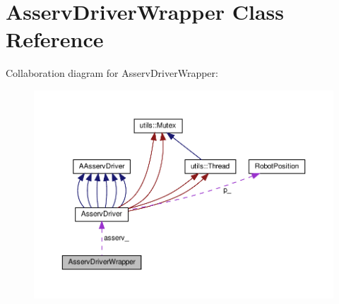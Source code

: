 \hypertarget{classAsservDriverWrapper}{}\section{Asserv\+Driver\+Wrapper Class Reference}
\label{classAsservDriverWrapper}


Collaboration diagram for Asserv\+Driver\+Wrapper\+:
\nopagebreak
\begin{figure}[H]
\begin{center}
\leavevmode
\includegraphics[width=350pt]{classAsservDriverWrapper__coll__graph}
\end{center}
\end{figure}
